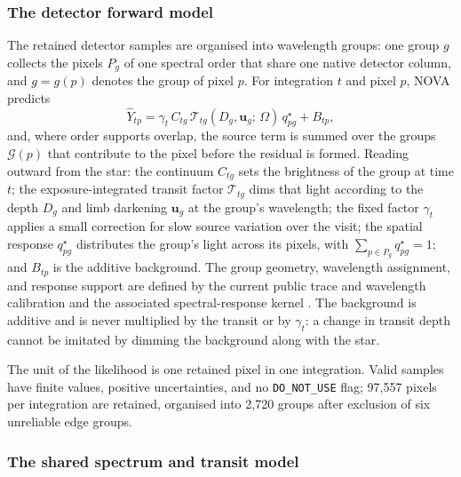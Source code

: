 \subsubsection{The detector forward model}


The retained detector samples are organised into wavelength groups: one
group $g$ collects the pixels $P_g$ of one spectral order that share one
native detector column, and $g=g(p)$ denotes the group of pixel $p$. For
integration $t$ and pixel $p$, NOVA predicts
\begin{equation}
 \widehat Y_{tp}
 = \gamma_t\, C_{tg}\,
   \mathcal{T}_{tg}(D_g, \bm{u}_g;\, \Omega)\,
   q^\star_{pg}
 + B_{tp},
 \label{eq:nova-forward}
\end{equation}
and, where order supports overlap, the source term is summed over the
groups $\mathcal{G}(p)$ that contribute to the pixel before the residual
is formed. Reading outward from the star: the continuum $C_{tg}$ sets the
brightness of the group at time $t$; the exposure-integrated transit
factor $\mathcal{T}_{tg}$ dims that light according to the depth $D_g$ and
limb darkening $\bm{u}_g$ at the group's wavelength; the fixed factor
$\gamma_t$ applies a small correction for slow source variation over the
visit; the spatial response $q^\star_{pg}$ distributes the group's light
across its pixels, with $\sum_{p\in P_g} q^\star_{pg}=1$; and $B_{tp}$ is
the additive background. The group geometry, wavelength assignment, and
response support are defined by the current public trace and wavelength
calibration \citep{BainesEtAl2023Trace,BainesEtAl2023Wavelength} and the
associated spectral-response kernel
\citep{DarveauBernierEtAl2022,JWSTPipeline2025}. The background is
additive and is never multiplied by the transit or by $\gamma_t$: a change
in transit depth cannot be imitated by dimming the background along with
the star.

The unit of the likelihood is one retained pixel in one integration.
Valid samples have finite values, positive uncertainties, and no
\texttt{DO\_NOT\_USE} flag; 97{,}557 pixels per integration are retained,
organised into 2{,}720 groups after exclusion of six unreliable edge
groups.

\subsubsection{The shared spectrum and transit model}

